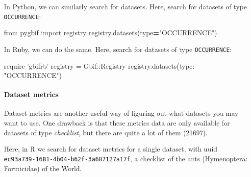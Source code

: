 \documentclass[author-year, review, 11pt]{components/elsarticle} %
\newenvironment{Shaded}{\begin{snugshade}}{\end{snugshade}}
\newcommand{\KeywordTok}[1]{\textcolor[rgb]{0.13,0.29,0.53}{\textbf{#1}}}
\newcommand{\DataTypeTok}[1]{\textcolor[rgb]{0.13,0.29,0.53}{#1}}
\newcommand{\StringTok}[1]{\textcolor[rgb]{0.31,0.60,0.02}{#1}}
\newcommand{\ImportTok}[1]{#1}
\newcommand{\OperatorTok}[1]{\textcolor[rgb]{0.81,0.36,0.00}{\textbf{#1}}}
\newcommand{\BuiltInTok}[1]{#1}
\newcommand{\NormalTok}[1]{#1}
\begin{document}
In Python, we can similarly search for datasets. Here, search for
datasets of type \texttt{OCCURRENCE}:

\begin{Shaded}
\begin{Highlighting}[]
\ImportTok{from}\NormalTok{ pygbif }\ImportTok{import}\NormalTok{ registry}
\NormalTok{registry.datasets(}\BuiltInTok{type}\OperatorTok{=}\StringTok{"OCCURRENCE"}\NormalTok{)}
\end{Highlighting}
\end{Shaded}

In Ruby, we can do the same. Here, search for datasets of type
\texttt{OCCURRENCE}:

\begin{Shaded}
\begin{Highlighting}[]
\NormalTok{require }\StringTok{'gbifrb'}
\NormalTok{registry = }\DataTypeTok{Gbif}\NormalTok{::}\DataTypeTok{Registry}
\NormalTok{registry.datasets(}\StringTok{type: "OCCURRENCE"}\NormalTok{)}
\end{Highlighting}
\end{Shaded}

\paragraph{Dataset metrics}\label{dataset-metrics}

Dataset metrics are another useful way of figuring out what datasets you
may want to use. One drawback is that these metrics data are only
available for datasets of type \emph{checklist}, but there are quite a
lot of them (21697).

Here, in R we search for dataset metrics for a single dataset, with uuid
\texttt{ec93a739-1681-4b04-b62f-3a687127a17f}, a checklist of the ants
(Hymenoptera: Formicidae) of the World.

\begin{Shaded}
\end{Shaded}
\end{document}
